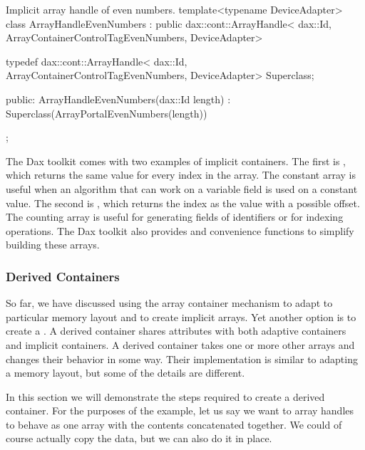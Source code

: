 \begin{daxexample}{Implicit array handle of even numbers.}
template<typename DeviceAdapter>
class ArrayHandleEvenNumbers
    : public dax::cont::ArrayHandle<
                dax::Id, ArrayContainerControlTagEvenNumbers, DeviceAdapter>
{
  typedef dax::cont::ArrayHandle<
                dax::Id, ArrayContainerControlTagEvenNumbers, DeviceAdapter> Superclass;

public:
  ArrayHandleEvenNumbers(dax::Id length)
    : Superclass(ArrayPortalEvenNumbers(length)) {  }
};
\end{daxexample}

The Dax toolkit comes with two examples of implicit containers. The first
is , which returns the same value for every
index in the array. The constant array is useful when an algorithm that can
work on a variable field is used on a constant value. The second is
, which returns the index as the value with a
possible offset. The counting array is useful for generating fields of
identifiers or for indexing operations. The Dax toolkit also provides
 and 
convenience functions to simplify building these arrays.


\subsubsection{Derived Containers}


So far, we have discussed using the array container mechanism to adapt to
particular memory layout and to create implicit arrays. Yet another option
is to create a . A derived container shares
attributes with both adaptive containers and implicit containers. A derived
container takes one or more other arrays and changes their behavior in some
way. Their implementation is similar to adapting a memory layout, but some
of the details are different.

In this section we will demonstrate the steps required to create a derived
container. For the purposes of the example, let us say we want to array
handles to behave as one array with the contents concatenated together. We
could of course actually copy the data, but we can also do it in place.

